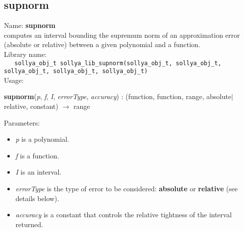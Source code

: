 \subsection{supnorm}
\label{labsupnorm}
\noindent Name: \textbf{supnorm}\\
\phantom{aaa}computes an interval bounding the supremum norm of an approximation error (absolute or relative) between a given polynomial and a function.\\[0.2cm]
\noindent Library name:\\
\verb|   sollya_obj_t sollya_lib_supnorm(sollya_obj_t, sollya_obj_t, sollya_obj_t, sollya_obj_t, sollya_obj_t)|\\[0.2cm]
\noindent Usage: 
\begin{center}
\textbf{supnorm}(\emph{p}, \emph{f}, \emph{I}, \emph{errorType}, \emph{accuracy}) : (\textsf{function}, \textsf{function}, \textsf{range}, \textsf{absolute$|$relative}, \textsf{constant}) $\rightarrow$ \textsf{range}\\
\end{center}
Parameters: 
\begin{itemize}
\item \emph{p} is a polynomial.
\item \emph{f} is a function.
\item \emph{I} is an interval.
\item \emph{errorType} is the type of error to be considered: \textbf{absolute} or \textbf{relative} (see details below).
\item \emph{accuracy} is a constant that controls the relative tightness of the interval returned. 
\end{itemize}
